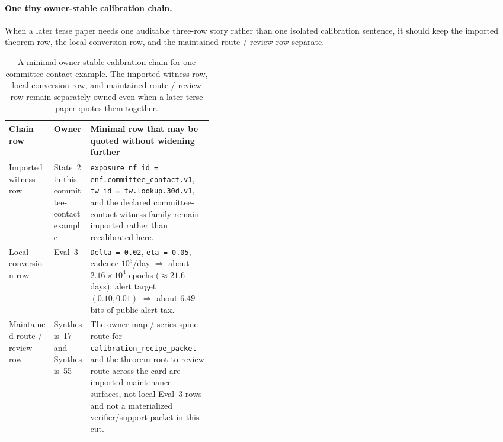 \documentclass[11pt]{article}
\begin{document}
\paragraph{One tiny owner-stable calibration chain.}
When a later terse paper needs one auditable three-row story rather than one isolated calibration sentence, it should keep the imported theorem row, the local conversion row, and the maintained route / review row separate.

\begin{table}[t]
\centering
\small
\begin{tabularx}{0.97\linewidth}{@{}p{0.22\linewidth}p{0.18\linewidth}X@{}}
\toprule
\textbf{Chain row} & \textbf{Owner} & \textbf{Minimal row that may be quoted without widening further}\\
\midrule
Imported witness row & State~2 in this committee-contact example & \texttt{exposure\_nf\_id = enf.committee\_contact.v1}, \texttt{tw\_id = tw.lookup.30d.v1}, and the declared committee-contact witness family remain imported rather than recalibrated here.\\
Local conversion row & Eval~3 & \texttt{Delta = 0.02}, \texttt{eta = 0.05}, cadence $10^3$/day $\Rightarrow$ about $2.16\times 10^4$ epochs ($\approx 21.6$ days); alert target $(0.10,0.01)$ $\Rightarrow$ about $6.49$ bits of public alert tax.\\
Maintained route / review row & Synthesis~17 and Synthesis~55 & The owner-map / series-spine route for \nolinkurl{calibration_recipe_packet} and the theorem-root-to-review route across the card are imported maintenance surfaces, not local Eval~3 rows and not a materialized verifier/support packet in this cut.\\
\bottomrule
\end{tabularx}
\caption{A minimal owner-stable calibration chain for one committee-contact example. The imported witness row, local conversion row, and maintained route / review row remain separately owned even when a later terse paper quotes them together.}
\label{tab:calibration-chain-card}
\end{table}
\end{document}
